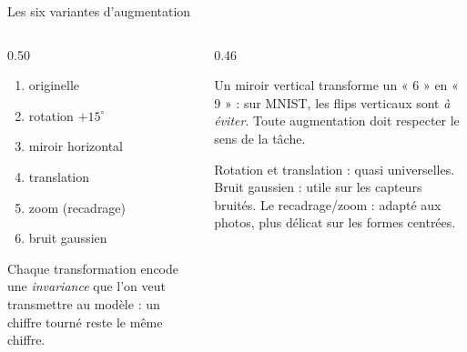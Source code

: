 \begin{frame}{Les six variantes d'augmentation}
\begin{columns}[t]
\begin{column}{0.50\textwidth}
\begin{ebox}
\begin{enumerate}
  \item originelle
  \item rotation $+15^\circ$
  \item miroir horizontal
  \item translation
  \item zoom (recadrage)
  \item bruit gaussien
\end{enumerate}
\end{ebox}
\begin{kbox}[Le principe]
Chaque transformation encode une \emph{invariance} que l'on veut transmettre au
modèle : un chiffre tourné reste le même chiffre.
\end{kbox}
\end{column}
\begin{column}{0.46\textwidth}
\begin{wbox}
Un miroir vertical transforme un « 6 » en « 9 » : sur MNIST, les flips
verticaux sont \emph{à éviter}. Toute augmentation doit respecter le sens de la
tâche.
\end{wbox}
\begin{ebox}[En pratique]
Rotation et translation : quasi universelles. Bruit gaussien : utile sur les
capteurs bruités. Le recadrage/zoom : adapté aux photos, plus délicat sur les
formes centrées.
\end{ebox}
\end{column}
\end{columns}
\end{frame}

